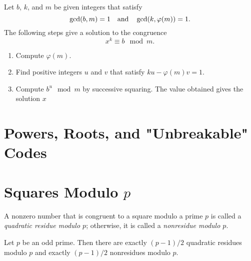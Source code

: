 \documentclass[10pt]{article}
\begin{document}
\begin{comment}
\begin{theorem*}[\textcolor{red}{$k$\textsuperscript{th} Roots Modulo $m$}]
Let $b$, $k$, and $m$ be integers. Suppose $\gcd(b,m)=1$ and $\gcd(k, \varphi(m))=1$.    Assume $ku \equiv 1 \mod{\varphi(m)}$.
If $x^k \equiv b \mod{m}$, then $x \equiv b^u \mod{m}$.
\end{theorem*}
\end{comment}

\begin{algorithm}
Let $b$, $k$, and $m$ be given integers that satisfy
    \[\gcd(b,m)=1 \quad \textnormal{and} \quad \gcd(k, \varphi(m))=1.\]
    The following steps give a solution to the congruence
    \[x^k \equiv b \mod{m}.\]
    \begin{enumerate}
        \item Compute $\varphi(m)$.
        \item Find positive integers $u$ and $v$ that satisfy $ku-\varphi(m)v=1$.
        \item Compute $b^u \mod{m}$ by successive squaring. The value obtained gives the solution $x$
    \end{enumerate}
\end{algorithm}

\section{Powers, Roots, and "Unbreakable" Codes}

\setcounter{section}{19}
\section{Squares Modulo $p$}

\begin{definition*}[\textcolor{red}{Quadratic Residue modulo $p$}]
    A nonzero number that is congruent to a square modulo a prime $p$ is called a \textit{quadratic residue modulo $p$}; otherwise, it is called a \textit{nonresidue modulo $p$}.
\end{definition*}

\begin{theorem}Let $p$ be an odd prime. Then there are exactly $(p-1)/2$ quadratic residues modulo $p$ and exactly $(p-1)/2$ nonresidues modulo $p$.
\end{theorem}
\end{document}
